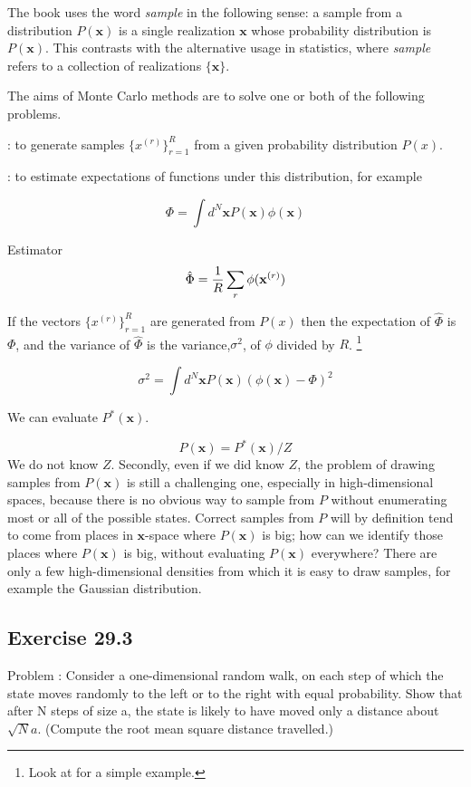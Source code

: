 \documentclass[a4paper,11pt]{article}
\newcommand{\vect}[1]{\boldsymbol{\mathbf{#1}}}
\numberwithin{equation}{section}
\begin{document}
{The book uses the word {\it sample} in the following sense: a sample
from a distribution $P(\vect x)$ is a single realization $\vect x$ whose probability distribution
is $P(\vect x)$. This contrasts with the alternative usage in statistics, where {\it sample}
refers to a collection of realizations $\{\vect x\}$.

The aims of Monte Carlo methods are to solve one or both of the
following problems.

\vect{Problem 1}: to generate samples $\{x^{(r)}\}^R_{r=1}$ from a given probability distribution
$P(x)$.

\vect{Problem 2}: to estimate expectations of functions under this distribution, for
example

$$
\Phi = \int d^N \vect x P(\vect x) \phi(\vect x)
$$

Estimator
$$
\hat \Phi = {1 \over R} \sum_r \phi(\vect x^{(r)})
$$

If the vectors $\{x^{(r)}\}^R_{r=1}$ are generated from $P(x)$ then the expectation of $\hat \Phi$ is $\Phi$, and the variance of $\hat \Phi$ is the variance,$\sigma^2$, of $\phi$ divided by $R$. \footnote{Look at \href{https://github.com/physhik/Study-of-David-Mackay-s-book-/blob/master/PopulationAndSampling.pdf}{\vect{this}} for a simple example.}

$$
\sigma^2 = \int d^N \vect x P(\vect x) (\phi(\vect x) - \Phi)^2
$$

We can evaluate $P^*(\vect x)$.

$$
P(\vect x)=P^*(\vect x)/Z
$$
We do not know $Z$. Secondly, even if we did know $Z$, the problem of drawing samples
from $P(\vect x)$ is still a challenging one, especially in high-dimensional spaces,
because there is no obvious way to sample from $P$ without enumerating most
or all of the possible states. Correct samples from $P$ will by definition tend
to come from places in $\vect x$-space where $P(\vect x)$ is big; how can we identify those
places where $P(\vect x)$ is big, without evaluating $P(\vect x)$ everywhere? There are only
a few high-dimensional densities from which it is easy to draw samples, for
example the Gaussian distribution.


\subsection{Exercise 29.3}

Problem : Consider a one-dimensional random walk, on each step of
which the state moves randomly to the left or to the right with equal
probability. Show that after N steps of size a, the state is likely to have
moved only a distance about $\sqrt{N}a$. (Compute the root mean square
distance travelled.)

}
\end{document}
